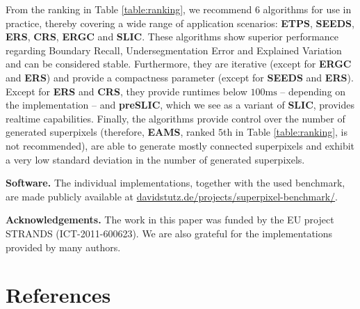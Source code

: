 \documentclass[5p]{elsarticle}
\def\EAMS{\textbf{EAMS}\xspace}
\def\SLIC{\textbf{SLIC}\xspace}
\def\CRS{\textbf{CRS}\xspace}
\def\ERS{\textbf{ERS}\xspace}
\def\SEEDS{\textbf{SEEDS}\xspace}
\def\preSLIC{\textbf{preSLIC}\xspace}
\def\ERGC{\textbf{ERGC}\xspace}
\def\ETPS{\textbf{ETPS}\xspace}
\begin{document}
From the ranking in Table \ref{table:ranking}, we recommend 6 algorithms for use in practice,
thereby covering a wide range of application scenarios: \ETPS \cite{YaoBobenFidlerUrtasun:2015},
\SEEDS \cite{VanDenBerghBoixRoigCapitaniVanGool:2012}, \ERS \cite{LiuTuzelRamalingamChellappa:2011},
\CRS \cite{MesterConradGuevara:2011,ConradMertzMester:2013}, \ERGC \cite{BuyssensGardinRuan:2014}
and \SLIC \cite{AchantaShajiSmithLucchiFuaSuesstrunk:2010}.
These algorithms show superior performance regarding Boundary Recall, Undersegmentation
Error and Explained Variation and can be considered stable.
Furthermore, they are iterative (except for \ERGC and \ERS) and provide a compactness parameter (except for \SEEDS and \ERS).
Except for \ERS and \CRS, they provide runtimes below $100\text{ms}$ -- depending on the implementation --
and \preSLIC \cite{NeubertProtzel:2014}, which we see as a variant of \SLIC, provides realtime capabilities. Finally,
the algorithms provide control over the number of generated superpixels
(therefore, \EAMS, ranked $5$th in Table \ref{table:ranking}, is not recommended), are able to generate
mostly connected superpixels and exhibit a very low standard deviation in the number of generated superpixels.


\textbf{Software.} The individual implementations, together with the used benchmark,
are made publicly available at \url{davidstutz.de/projects/superpixel-benchmark/}.

\textbf{Acknowledgements.} The work in this paper was funded by the EU project STRANDS (ICT-2011-600623).
We are also grateful for the implementations provided by many authors. 


\section*{References}


\FloatBarrier
\clearpage
\newpage
\pagebreak
\FloatBarrier

\begin{appendix}
	
	
	
	
	
\end{appendix}
\end{document}

